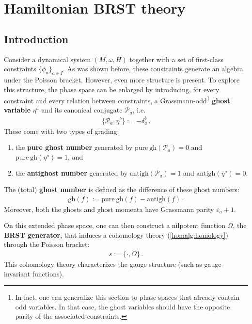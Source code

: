 \section{Hamiltonian BRST theory}\label{section:classical_brst}
\subsection{Introduction}\label{section:brst_introduction}

    Consider a dynamical system $(M,\omega,H)$ together with a set of first-class constraints $\{\phi_a\}_{a\in I}$. As was shown before, these constraints generate an algebra under the Poisson bracket. However, even more structure is present. To explore this structure, the phase space can be enlarged by introducing, for every constraint and every relation between constraints, a Grassmann-odd\footnote{In fact, one can generalize this section to phase spaces that already contain odd variables. In that case, the ghost variables should have the opposite parity of the associated constraints.} \textbf{ghost variable} $\eta^a$ and its canonical conjugate $\mathcal{P}_a$, i.e.
    \begin{gather}
        \{\mathcal{P}_a,\eta^b\} := -\delta^b_a\,.
    \end{gather}
    These come with two types of grading:
    \begin{enumerate}
        \item the \textbf{pure ghost number} generated by $\mathrm{pure\ gh}(\mathcal{P}_a) = 0$ and $\mathrm{pure\ gh}(\eta^a) = 1$, and
        \item the \textbf{antighost number} generated by $\mathrm{antigh}(\mathcal{P}_a) = 1$ and $\mathrm{antigh}(\eta^a) = 0$.
    \end{enumerate}
    The (total) \textbf{ghost number} is defined as the difference of these ghost numbers:
    \begin{gather}
        \mathrm{gh}(f) := \mathrm{pure\ gh}(f) - \mathrm{antigh}(f)\,.
    \end{gather}
    Moreover, both the ghosts and ghost momenta have Grassmann parity $\varepsilon_a+1$.

    On this extended phase space, one can then construct a nilpotent function $\Omega$, the \textbf{BRST generator}, that induces a cohomology theory (\cref{homalg:homology}) through the Poisson bracket:
    \begin{gather}
        s := \{\cdot,\Omega\}\,.
    \end{gather}
    This cohomology theory characterizes the gauge structure (such as gauge-invariant functions).

